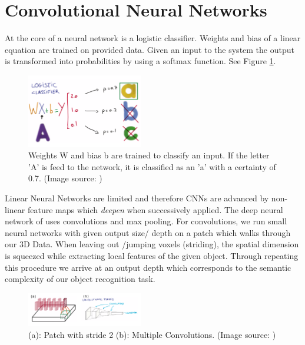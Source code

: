 \documentclass[10pt,twocolumn,letterpaper]{article}
\begin{document}
\section{Convolutional Neural Networks}

At the core of a neural network is a logistic classifier. 
Weights and bias of a linear equation are trained on provided data. Given an input to the system the output is
transformed into probabilities by using a softmax function. See Figure \ref{fig:classifier}.


\begin{figure}[h]
	\label{fig:classifier}
	\centering
	\includegraphics[width=0.45\textwidth]{figures/classifier}
	\caption{Weights W and bias b are trained to classify an input. If the letter 'A' is feed to the network,
	it is classified as an 'a' with a certainty of 0.7. (Image source: \cite{udacity})}
\end{figure}

Linear Neural Networks are limited and therefore CNNs are advanced by non-linear feature maps which \textit{deepen} when successively applied. The deep neural network of \cite{voxnet} uses convolutions and max pooling.
For convolutions, we run small neural networks with given output size/ depth on a patch which walks through our 3D Data. When leaving out /jumping voxels (striding),
the spatial dimension is squeezed while extracting local features of the given object. 
Through repeating this procedure we arrive at an output depth which corresponds to the semantic complexity of our object recognition task. 

\begin{figure}[h]
	\label{fig:convolution}
	\includegraphics[width=0.45\textwidth]{figures/conv}
	\caption{(a): Patch with stride 2 (b): Multiple Convolutions. (Image source: \cite{udacity})}
\end{figure}
\end{document}

